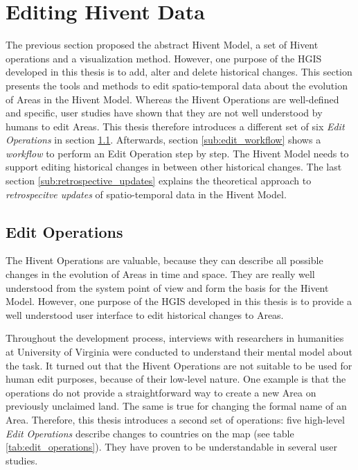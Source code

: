 
\section{Editing Hivent Data} %
\label{sec:editing_hivent_data}

The previous section proposed the abstract Hivent Model, a set of Hivent operations and a visualization method. However, one purpose of the HGIS developed in this thesis is to add, alter and delete historical changes. This section presents the tools and methods to edit spatio-temporal data about the evolution of Areas in the Hivent Model. Whereas the Hivent Operations are well-defined and specific, user studies have shown that they are not well understood by humans to edit Areas. This thesis therefore introduces a different set of six \emph{Edit Operations} in section \ref{sub:edit_operations}. Afterwards, section \ref{sub:edit_workflow} shows a \emph{workflow} to perform an Edit Operation step by step. The Hivent Model needs to support editing historical changes in between other historical changes. The last section \ref{sub:retrospective_updates} explains the theoretical approach to \emph{retrospecitve updates} of spatio-temporal data in the Hivent Model.

\subsection{Edit Operations} %
\label{sub:edit_operations}

The Hivent Operations are valuable, because they can describe all possible changes in the evolution of Areas in time and space. They are really well understood from the system point of view and form the basis for the Hivent Model. However, one purpose of the HGIS developed in this thesis is to provide a well understood user interface to edit historical changes to Areas.

Throughout the development process, interviews with researchers in humanities at University of Virginia were conducted to understand their mental model about the task. It turned out that the Hivent Operations are not suitable to be used for human edit purposes, because of their low-level nature. One example is that the operations do not provide a straightforward way to create a new Area on previously unclaimed land. The same is true for changing the formal name of an Area. Therefore, this thesis introduces a second set of operations: five high-level \emph{Edit Operations} describe changes to countries on the map (see table \ref{tab:edit_operations}). They have proven to be understandable in several user studies.

